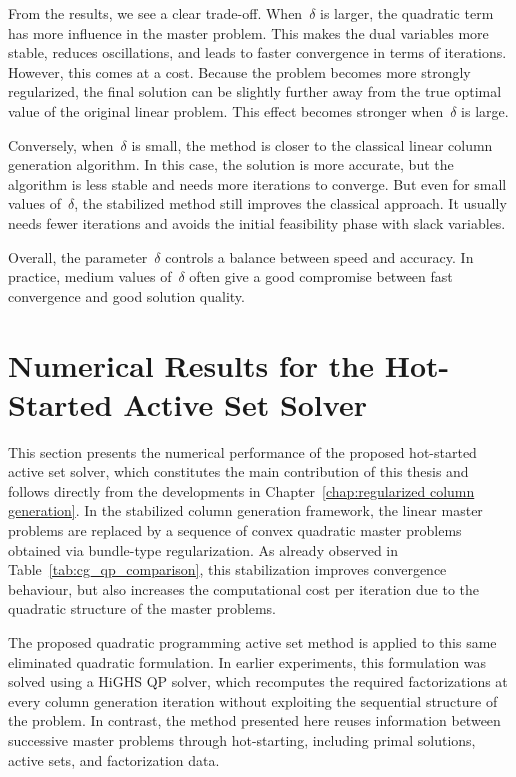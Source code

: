 \documentclass{book}
\theoremstyle{definition}
\newcounter{algorithm_}
\numberwithin{algorithm_}{chapter}
\begin{document}
{\bigskip

From the results, we see a clear trade-off. When~$\delta$ is larger, the quadratic term has more influence in the master problem. This makes the dual variables more stable, reduces oscillations, and leads to faster convergence in terms of iterations.
However, this comes at a cost. Because the problem becomes more strongly regularized, the final solution can be slightly further away from the true optimal value of the original linear problem. This effect becomes stronger when~$\delta$ is large.

\bigskip

Conversely, when~$\delta$ is small, the method is closer to the classical linear column generation algorithm. In this case, the solution is more accurate, but the algorithm is less stable and needs more iterations to converge. But even for small values of~$\delta$, the stabilized method still improves the classical approach. It usually needs fewer iterations and avoids the initial feasibility phase with slack variables.

\bigskip

Overall, the parameter~$\delta$ controls a balance between speed and accuracy. In practice, medium values of~$\delta$ often give a good compromise between fast convergence and good solution quality.



\section{Numerical Results for the Hot-Started Active Set Solver}

This section presents the numerical performance of the proposed hot-started active set solver, which constitutes the main contribution of this thesis and follows directly from the developments in Chapter~\ref{chap:regularized column generation}. In the stabilized column generation framework, the linear master problems are replaced by a sequence of convex quadratic master problems obtained via bundle-type regularization. As already observed in Table~\ref{tab:cg_qp_comparison}, this stabilization improves convergence behaviour, but also increases the computational cost per iteration due to the quadratic structure of the master problems.

\bigskip

The proposed quadratic programming active set method is applied to this same eliminated quadratic formulation. In earlier experiments, this formulation was solved using a HiGHS QP solver, which recomputes the required factorizations at every column generation iteration without exploiting the sequential structure of the problem. In contrast, the method presented here reuses information between successive master problems through hot-starting, including primal solutions, active sets, and factorization data.

}
\end{document}
